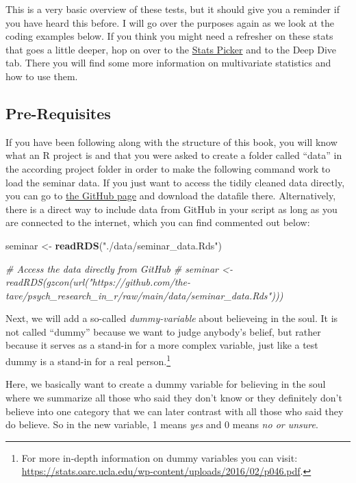 \documentclass[
]{book}
\newenvironment{Shaded}{\begin{snugshade}}{\end{snugshade}}
\newcommand{\CommentTok}[1]{\textcolor[rgb]{0.56,0.35,0.01}{\textit{#1}}}
\newcommand{\FunctionTok}[1]{\textcolor[rgb]{0.13,0.29,0.53}{\textbf{#1}}}
\newcommand{\NormalTok}[1]{#1}
\newcommand{\OtherTok}[1]{\textcolor[rgb]{0.56,0.35,0.01}{#1}}
\newcommand{\StringTok}[1]{\textcolor[rgb]{0.31,0.60,0.02}{#1}}
\begin{document}
This is a very basic overview of these tests, but it should give you a reminder if you have heard this before.
I will go over the purposes again as we look at the coding examples below.
If you think you might need a refresher on these stats that goes a little deeper, hop on over to the \href{https://the-tave.shinyapps.io/Statistik-Picker}{Stats Picker} and to the Deep Dive tab.
There you will find some more information on multivariate statistics and how to use them.

\subsection{Pre-Requisites}\label{pre-requisites}

If you have been following along with the structure of this book, you will know what an R project is and that you were asked to create a folder called ``data'' in the according project folder in order to make the following command work to load the seminar data.
If you just want to access the tidily cleaned data directly, you can go to \href{https://github.com/the-tave/psych_research_in_r/blob/main/data/seminar_data.Rds}{the GitHub page} and download the datafile there.
Alternatively, there is a direct way to include data from GitHub in your script as long as you are connected to the internet, which you can find commented out below:

\begin{Shaded}
\begin{Highlighting}[]
\NormalTok{seminar }\OtherTok{\textless{}{-}} \FunctionTok{readRDS}\NormalTok{(}\StringTok{"./data/seminar\_data.Rds"}\NormalTok{)}

\CommentTok{\# Access the data directly from GitHub}
\CommentTok{\# seminar \textless{}{-} readRDS(gzcon(url("https://github.com/the{-}tave/psych\_research\_in\_r/raw/main/data/seminar\_data.Rds")))}
\end{Highlighting}
\end{Shaded}

Next, we will add a so-called \emph{dummy-variable} about believeing in the soul.
It is not called ``dummy'' because we want to judge anybody's belief, but rather because it serves as a stand-in for a more complex variable, just like a test dummy is a stand-in for a real person.\footnote{For more in-depth information on dummy variables you can visit: \url{https://stats.oarc.ucla.edu/wp-content/uploads/2016/02/p046.pdf}.}

Here, we basically want to create a dummy variable for believing in the soul where we summarize all those who said they don't know or they definitely don't believe into one category that we can later contrast with all those who said they do believe.
So in the new variable, 1 means \emph{yes} and 0 means \emph{no or unsure}.
\end{document}

